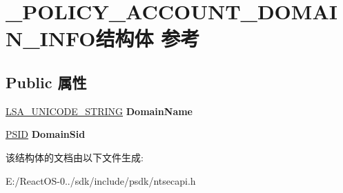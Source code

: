 \hypertarget{struct___p_o_l_i_c_y___a_c_c_o_u_n_t___d_o_m_a_i_n___i_n_f_o}{}\section{\+\_\+\+P\+O\+L\+I\+C\+Y\+\_\+\+A\+C\+C\+O\+U\+N\+T\+\_\+\+D\+O\+M\+A\+I\+N\+\_\+\+I\+N\+F\+O结构体 参考}
\label{struct___p_o_l_i_c_y___a_c_c_o_u_n_t___d_o_m_a_i_n___i_n_f_o}
\subsection*{Public 属性}
\begin{DoxyCompactItemize}
\item 
\mbox{\label{struct___p_o_l_i_c_y___a_c_c_o_u_n_t___d_o_m_a_i_n___i_n_f_o_ac2947ffb07329007fd6b4c46531441ce}} 
\hyperlink{struct___l_s_a___u_n_i_c_o_d_e___s_t_r_i_n_g}{L\+S\+A\+\_\+\+U\+N\+I\+C\+O\+D\+E\+\_\+\+S\+T\+R\+I\+NG} {\bfseries Domain\+Name}
\item 
\mbox{\label{struct___p_o_l_i_c_y___a_c_c_o_u_n_t___d_o_m_a_i_n___i_n_f_o_a99bfa44729fa8d19f41c7569b9015398}} 
\hyperlink{struct___s_i_d}{P\+S\+ID} {\bfseries Domain\+Sid}
\end{DoxyCompactItemize}


该结构体的文档由以下文件生成\+:\begin{DoxyCompactItemize}
\item 
E\+:/\+React\+O\+S-\/0../sdk/include/psdk/ntsecapi.\+h\end{DoxyCompactItemize}

